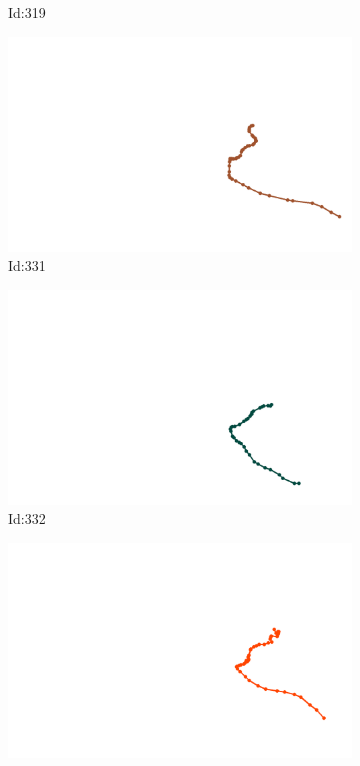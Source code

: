\documentclass[12pt,twoside]{report}
\begin{document}
\begin{figure}
\begin{subfigure}[b]{0.20\textwidth}
\caption{Id:319}
\end{subfigure}
\begin{subfigure}[b]{0.20\textwidth}
\centering
\includegraphics[width=\textwidth]{../trajectories/331.png}
\caption{Id:331}
\end{subfigure}
\begin{subfigure}[b]{0.20\textwidth}
\centering
\includegraphics[width=\textwidth]{../trajectories/332.png}
\caption{Id:332}
\end{subfigure}
\begin{subfigure}[b]{0.20\textwidth}
\centering
\includegraphics[width=\textwidth]{../trajectories/349.png}

\end{subfigure}
\end{figure}
\end{document}
